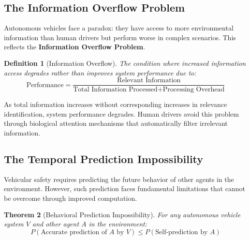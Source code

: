 \documentclass[12pt,a4paper]{article}
\newtheorem{theorem}{Theorem}[section]
\newtheorem{definition}[theorem]{Definition}
\begin{document}
\subsection{The Information Overflow Problem}

Autonomous vehicles face a paradox: they have access to more environmental information than human drivers but perform worse in complex scenarios. This reflects the \textbf{Information Overflow Problem}.

\begin{definition}[Information Overflow]
The condition where increased information access degrades rather than improves system performance due to:
$$\text{Performance} = \frac{\text{Relevant Information}}{\text{Total Information Processed} + \text{Processing Overhead}}$$
\end{definition}

As total information increases without corresponding increases in relevance identification, system performance degrades. Human drivers avoid this problem through biological attention mechanisms that automatically filter irrelevant information.

\subsection{The Temporal Prediction Impossibility}

Vehicular safety requires predicting the future behavior of other agents in the environment. However, such prediction faces fundamental limitations that cannot be overcome through improved computation.

\begin{theorem}[Behavioral Prediction Impossibility]
For any autonomous vehicle system $V$ and other agent $A$ in the environment:
$$P(\text{Accurate prediction of } A \text{ by } V) \leq P(\text{Self-prediction by } A)$$
\end{theorem}
\end{document}

